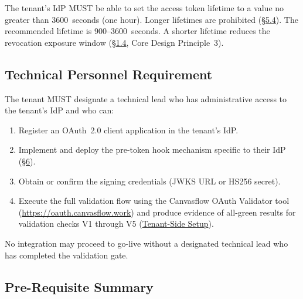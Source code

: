 The tenant's IdP MUST be able to set the access token lifetime to a value no greater
than 3600~seconds (one hour). Longer lifetimes are prohibited 
(\hyperref[sec:required-payload-claims]{\S5.4}). The recommended lifetime is 
900--3600~seconds. A shorter lifetime reduces the revocation exposure window
(\hyperref[sec:revocation]{\S1.4}, Core Design Principle~3).

\subsection{Technical Personnel Requirement}

The tenant MUST designate a technical lead who has administrative access to the
tenant's IdP and who can:

\begin{enumerate}
  \item Register an OAuth~2.0 client application in the tenant's IdP.
  \item Implement and deploy the pre-token hook mechanism specific to their IdP (\hyperref[sec:hook-configuration]{\S6}).
  \item Obtain or confirm the signing credentials (JWKS URL or HS256 secret).
  \item Execute the full validation flow using the Canvasflow OAuth Validator tool
    (\url{https://oauth.canvasflow.work}) and produce evidence of all-green results for
    validation checks V1 through V5 (\hyperref[sec:tenant-side-setup]{Tenant-Side Setup}).
\end{enumerate}



No integration may proceed to go-live without a designated technical lead who has
completed the validation gate.

\subsection{Pre-Requisite Summary}

